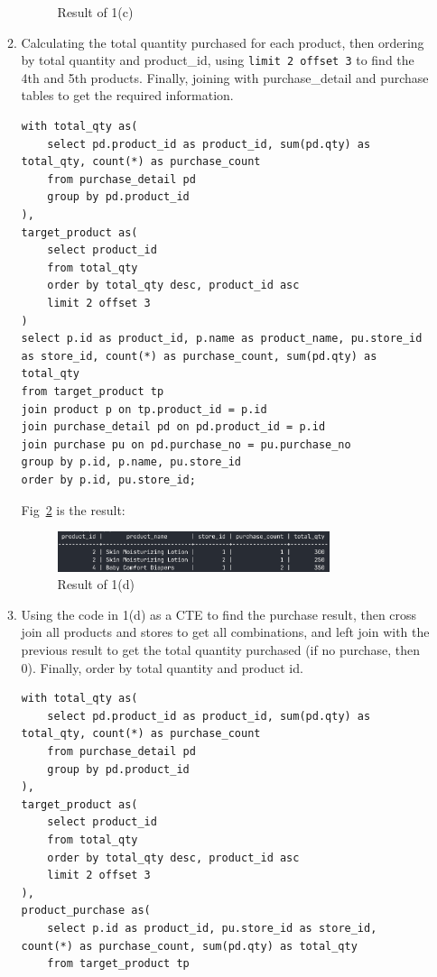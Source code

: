 \documentclass[12pt,a4paper]{article}
\begin{document}
\begin{enumerate}
\begin{enumerate}
\begin{figure}[H]
            \caption{Result of 1(c)}
            \label{fig:1c}
        \end{figure}
        \item Calculating the total quantity purchased for each product, then ordering by total quantity and product\_id, using \texttt{limit 2 offset 3} to find the 4th and 5th products. Finally, joining with purchase\_detail and purchase tables to get the required information.
        \begin{verbatim}
with total_qty as(
    select pd.product_id as product_id, sum(pd.qty) as total_qty, count(*) as purchase_count
    from purchase_detail pd
    group by pd.product_id
),
target_product as(
    select product_id
    from total_qty
    order by total_qty desc, product_id asc
    limit 2 offset 3
)
select p.id as product_id, p.name as product_name, pu.store_id as store_id, count(*) as purchase_count, sum(pd.qty) as total_qty
from target_product tp
join product p on tp.product_id = p.id
join purchase_detail pd on pd.product_id = p.id
join purchase pu on pd.purchase_no = pu.purchase_no
group by p.id, p.name, pu.store_id
order by p.id, pu.store_id;
        \end{verbatim}
        Fig~\ref{fig:1d} is the result:
        \begin{figure}[H]
            \centering
            \includegraphics[width=0.8\textwidth]{src/1d.png}
            \caption{Result of 1(d)}
            \label{fig:1d}
        \end{figure}
        \item Using the code in 1(d) as a CTE to find the purchase result, then cross join all products and stores to get all combinations, and left join with the previous result to get the total quantity purchased (if no purchase, then 0). Finally, order by total quantity and product id.
        \begin{verbatim}
with total_qty as(
    select pd.product_id as product_id, sum(pd.qty) as total_qty, count(*) as purchase_count
    from purchase_detail pd
    group by pd.product_id
),
target_product as(
    select product_id
    from total_qty
    order by total_qty desc, product_id asc
    limit 2 offset 3
), 
product_purchase as(
    select p.id as product_id, pu.store_id as store_id, count(*) as purchase_count, sum(pd.qty) as total_qty
    from target_product tp

\end{verbatim}
\end{enumerate}
\end{enumerate}
\end{document}

